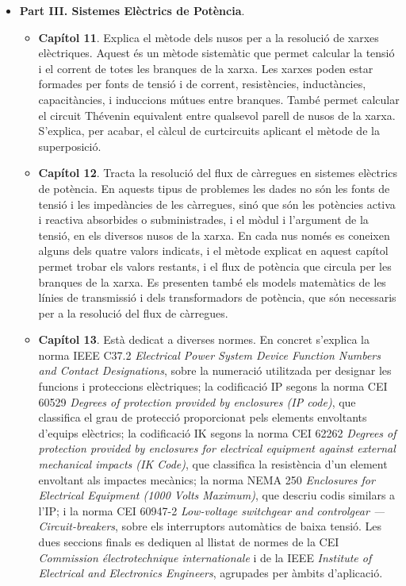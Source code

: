 \begin{itemize}
\begin{itemize}
		\end{itemize}
		\item \textbf{Part III. Sistemes Elèctrics de Potència}. 
		\begin{itemize}
			\item \textbf{Capítol 11}. Explica el mètode dels nusos per a la resolució de xarxes elèctriques. Aquest és un mètode sistemàtic que permet calcular la tensió i el corrent de totes les branques de la xarxa. Les xarxes poden estar  formades per fonts de tensió i de corrent, resistències, inductàncies, capacitàncies, i induccions mútues entre branques. També permet calcular el circuit Thévenin equivalent entre qualsevol parell de nusos de la xarxa. S'explica, per acabar, el càlcul de curtcircuits aplicant el mètode de la superposició.
			\item \textbf{Capítol 12}. Tracta la resolució del  flux de càrregues en sistemes 	elèctrics de potència. En aquests tipus de problemes les dades no són les fonts de tensió i les impedàncies de les càrregues, sinó que són les potències activa i reactiva absorbides o subministrades, i el mòdul i l'argument de la tensió, en els diversos nusos de la xarxa. En cada nus només es coneixen alguns dels quatre valors indicats, i el mètode explicat en aquest capítol permet trobar els valors restants, i el flux de potència que circula per les branques de la xarxa. Es presenten també els models matemàtics de les línies de transmissió i dels transformadors de potència, que són necessaris per a la resolució del flux de càrregues.
			\item \textbf{Capítol 13}. Està dedicat a  diverses normes. En concret s'explica la norma IEEE C37.2 \textit{Electrical Power System Device Function Numbers and Contact Designations}, sobre la numeració utilitzada per designar les funcions i proteccions elèctriques; la codificació IP segons la norma CEI 60529 \textit{Degrees of protection provided by enclosures (IP code)}, que classifica el grau de protecció proporcionat pels 			elements envoltants d’equips elèctrics; la codificació IK segons  la norma CEI 62262 \textit{Degrees of protection provided by enclosures for 			electrical equipment against external mechanical impacts (IK Code)}, que  classifica la resistència d’un
			element envoltant als impactes mecànics; la norma
			NEMA 250 \textit{Enclosures for Electrical Equipment (1000 Volts Maximum)}, que descriu codis similars a l'IP; i la norma CEI 60947-2 \textit{Low-voltage switchgear and controlgear --- Circuit-breakers}, sobre els interruptors automàtics de baixa tensió. Les dues seccions finals es dediquen al llistat de normes de la CEI \textit{Commission électrotechnique internationale} i de la IEEE \textit{Institute of Electrical and Electronics Engineers}, agrupades per àmbits d'aplicació.

\end{itemize}
\end{itemize}
